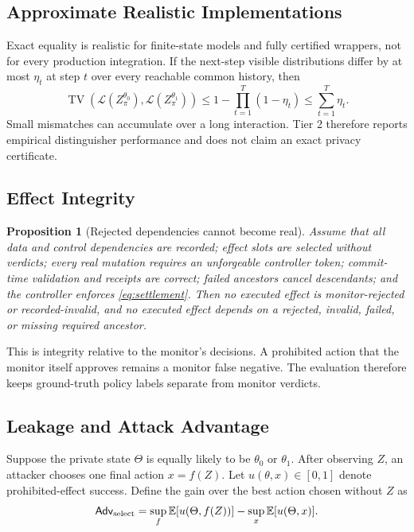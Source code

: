 \documentclass[10pt]{article}
\newtheorem{proposition}{Proposition}
\newcommand{\TV}{\operatorname{TV}}
\begin{document}
\subsection{Approximate Realistic Implementations}

Exact equality is realistic for finite-state models and fully certified wrappers, not for every production integration. If the next-step visible distributions differ by at most $\eta_t$ at step $t$ over every reachable common history, then
\begin{equation}
\TV\!\left(\mathcal L(Z^{\theta_0}_\pi),
\mathcal L(Z^{\theta_1}_\pi)\right)
\leq 1-\prod_{t=1}^{T}(1-\eta_t)
\leq\sum_{t=1}^{T}\eta_t.
\label{eq:tvcomposition}
\end{equation}
Small mismatches can accumulate over a long interaction. Tier 2 therefore reports empirical distinguisher performance and does not claim an exact privacy certificate.

\subsection{Effect Integrity}

\begin{proposition}[Rejected dependencies cannot become real]
\label{prop:commit}
Assume that all data and control dependencies are recorded; effect slots are selected without verdicts; every real mutation requires an unforgeable controller token; commit-time validation and receipts are correct; failed ancestors cancel descendants; and the controller enforces \eqref{eq:settlement}. Then no executed effect is monitor-rejected or recorded-invalid, and no executed effect depends on a rejected, invalid, failed, or missing required ancestor.
\end{proposition}

This is integrity relative to the monitor's decisions. A prohibited action that the monitor itself approves remains a monitor false negative. The evaluation therefore keeps ground-truth policy labels separate from monitor verdicts.

\subsection{Leakage and Attack Advantage}

Suppose the private state $\Theta$ is equally likely to be $\theta_0$ or $\theta_1$. After observing $Z$, an attacker chooses one final action $x=f(Z)$. Let $u(\theta,x)\in[0,1]$ denote prohibited-effect success. Define the gain over the best action chosen without $Z$ as
\begin{equation}
\mathsf{Adv}_{\rm select}
=\sup_f\mathbb E[u(\Theta,f(Z))]
-\sup_x\mathbb E[u(\Theta,x)].
\end{equation}
\end{document}
